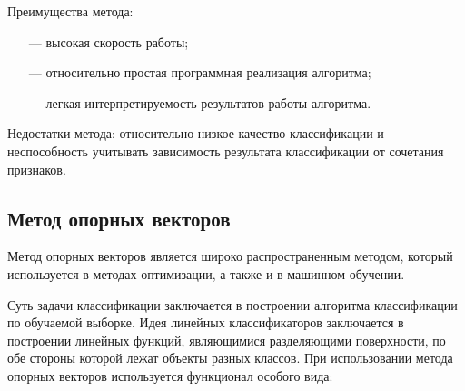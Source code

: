 Преимущества метода:
\begin{itemize}
	\item[---] высокая скорость работы;
	\item[---] относительно простая программная
	реализация алгоритма;
	\item[---] легкая интерпретируемость результатов
	работы алгоритма.
\end{itemize}

Недостатки метода: относительно низкое качество классификации и неспособность учитывать
зависимость результата классификации от сочетания признаков.







\subsection{Метод опорных векторов}

Метод опорных векторов является широко распространенным методом, который используется в методах оптимизации, а также и в машинном обучении.

Суть задачи классификации заключается в построении алгоритма классификации по обучаемой выборке. Идея линейных классификаторов заключается в
построении линейных функций, являющимися разделяющими поверхности, по
обе стороны которой лежат объекты разных классов. При использовании метода
опорных векторов используется функционал особого вида:

